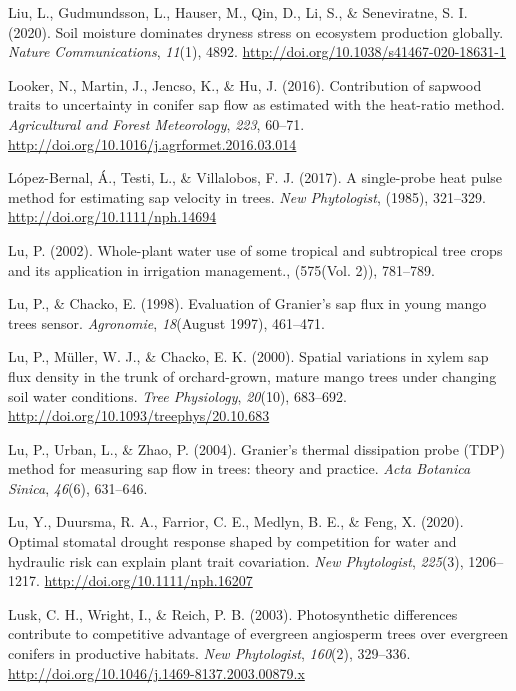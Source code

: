 \documentclass[11pt,twoside]{reedthesis}
\begin{document}
\hypertarget{ref-liu_soil_2020}{}
Liu, L., Gudmundsson, L., Hauser, M., Qin, D., Li, S., \& Seneviratne,
S. I. (2020). Soil moisture dominates dryness stress on ecosystem
production globally. \emph{Nature Communications}, \emph{11}(1), 4892.
\url{http://doi.org/10.1038/s41467-020-18631-1}

\hypertarget{ref-Looker2016}{}
Looker, N., Martin, J., Jencso, K., \& Hu, J. (2016). Contribution of
sapwood traits to uncertainty in conifer sap flow as estimated with the
heat-ratio method. \emph{Agricultural and Forest Meteorology},
\emph{223}, 60--71. \url{http://doi.org/10.1016/j.agrformet.2016.03.014}

\hypertarget{ref-Lopez-Bernal2017}{}
López-Bernal, Á., Testi, L., \& Villalobos, F. J. (2017). A single-probe
heat pulse method for estimating sap velocity in trees. \emph{New
Phytologist}, (1985), 321--329. \url{http://doi.org/10.1111/nph.14694}

\hypertarget{ref-Lu2002}{}
Lu, P. (2002). Whole-plant water use of some tropical and subtropical
tree crops and its application in irrigation management., (575(Vol. 2)),
781--789.

\hypertarget{ref-Lu1998}{}
Lu, P., \& Chacko, E. (1998). Evaluation of Granier's sap flux in young
mango trees sensor. \emph{Agronomie}, \emph{18}(August 1997), 461--471.

\hypertarget{ref-Lu2000}{}
Lu, P., Müller, W. J., \& Chacko, E. K. (2000). Spatial variations in
xylem sap flux density in the trunk of orchard-grown, mature mango trees
under changing soil water conditions. \emph{Tree Physiology},
\emph{20}(10), 683--692. \url{http://doi.org/10.1093/treephys/20.10.683}

\hypertarget{ref-Lu2004}{}
Lu, P., Urban, L., \& Zhao, P. (2004). Granier's thermal dissipation
probe (TDP) method for measuring sap flow in trees: theory and practice.
\emph{Acta Botanica Sinica}, \emph{46}(6), 631--646.

\hypertarget{ref-lu_optimal_2020}{}
Lu, Y., Duursma, R. A., Farrior, C. E., Medlyn, B. E., \& Feng, X.
(2020). Optimal stomatal drought response shaped by competition for
water and hydraulic risk can explain plant trait covariation. \emph{New
Phytologist}, \emph{225}(3), 1206--1217.
\url{http://doi.org/10.1111/nph.16207}

\hypertarget{ref-lusk_photosynthetic_2003}{}
Lusk, C. H., Wright, I., \& Reich, P. B. (2003). Photosynthetic
differences contribute to competitive advantage of evergreen angiosperm
trees over evergreen conifers in productive habitats. \emph{New
Phytologist}, \emph{160}(2), 329--336.
\url{http://doi.org/10.1046/j.1469-8137.2003.00879.x}
\end{document}
